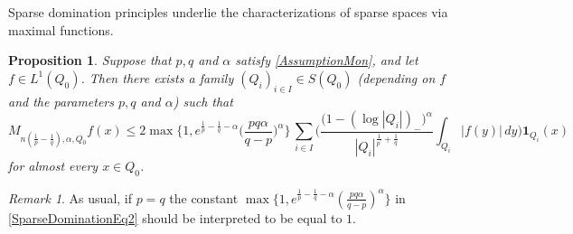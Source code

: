 \documentclass[11pt, a4paper,leqno]{amsart}
\theoremstyle{plain}
\newtheorem{proposition}{Proposition}
\numberwithin{equation}{section}
\theoremstyle{definition}
\theoremstyle{remark}
\newtheorem{remark}{Remark}
\begin{document}
Sparse domination principles underlie the characterizations of sparse spaces
via maximal functions.

\begin{proposition}
\label{SparseDomination2} Suppose that $p,q$ and $\alpha$ satisfy
\eqref{AssumptionMon}, and let $f\in L^{1}(Q_{0})$. Then there exists a family
$(Q_{i})_{i\in I}\in S(Q_{0})$ (depending on $f$ and the parameters $p,q$ and
$\alpha$) such that
\begin{equation}
M_{n(\frac{1}{p}-\frac{1}{q}),\alpha,Q_{0}}f(x)\leq2 \max\bigg\{1,e^{\frac
{1}{p}-\frac{1}{q}-\alpha}\bigg(\frac{pq\alpha}{q-p}\bigg)^{\alpha
}\bigg\}\,\sum_{i\in I}\bigg(\frac{\big(1-(\log|Q_{i}|)_{-}\big)^{\alpha}%
}{|Q_{i}|^{\frac{1}{p^{\prime}}+\frac{1}{q}}}\int_{Q_{i}}%
|f(y)|\,dy\bigg)\mathbf{1}_{Q_{i}}(x)\label{SparseDominationEq2}%
\end{equation}
for almost every $x\in Q_{0}$.
\end{proposition}

\begin{remark}
As usual, if $p=q$ the constant $\max\{1,e^{\frac{1}{p}-\frac{1}{q}-\alpha
}(\frac{pq\alpha}{q-p})^{\alpha}\}$ in \eqref{SparseDominationEq2} should be
interpreted to be equal to $1$.
\end{remark}
\end{document}
